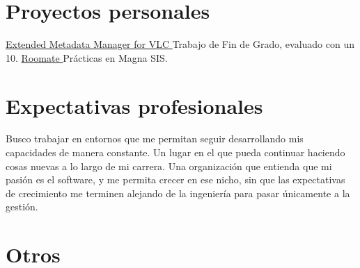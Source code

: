 \documentclass[letterpaper]{twentysecondcv} %
\begin{document}
\section{Proyectos personales}

\begin{twenty} %
    	{\href{https://github.com/ASantosVal/EMM_for_VLC}
    	{Extended Metadata Manager for VLC \faExternalLink} }
    	{}
    	{Trabajo de Fin de Grado, evaluado con un 10.}
    	{\href{https://roomate-magnarenove.herokuapp.com/}
    	{Roomate \faExternalLink} }
    	{}
    	{Prácticas en Magna SIS.}
\end{twenty}



\section{Expectativas profesionales}

Busco trabajar en entornos que me permitan seguir desarrollando mis capacidades de manera constante. Un lugar en el que pueda continuar haciendo cosas nuevas a lo largo de mi carrera. Una organización que entienda que mi pasión es el software, y me permita crecer en ese nicho, sin que las expectativas de crecimiento me terminen alejando de la ingeniería para pasar únicamente a la gestión.


\section{Otros}

\begin{customList} %
\end{customList}

\end{document}
